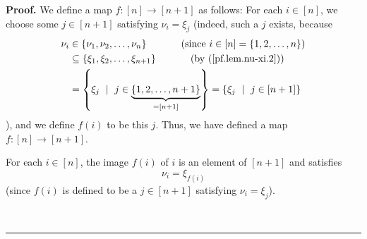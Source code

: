 \documentclass
[numbers=enddot,12pt,final,onecolumn,notitlepage,english]{scrartcl}%
\theoremstyle{definition}
\newenvironment{proof}[1][Proof]{\noindent\textbf{#1.} }{\ \rule{0.5em}{0.5em}}
\newenvironment{verlong}{}{}
\begin{document}
\begin{verlong}
\begin{proof}
We define a map $f:\left[  n\right]  \rightarrow\left[  n+1\right]  $ as
follows: For each $i\in\left[  n\right]  $, we choose some $j\in\left[
n+1\right]  $ satisfying $\nu_{i}=\xi_{j}$ (indeed, such a $j$ exists,
because
\begin{align*}
\nu_{i}  &  \in\left\{  \nu_{1},\nu_{2},\ldots,\nu_{n}\right\}
\ \ \ \ \ \ \ \ \ \ \left(  \text{since }i\in\left[  n\right]  =\left\{
1,2,\ldots,n\right\}  \right) \\
&  \subseteq\left\{  \xi_{1},\xi_{2},\ldots,\xi_{n+1}\right\}
\ \ \ \ \ \ \ \ \ \ \left(  \text{by (\ref{pf.lem.nu-xi.2})}\right) \\
&  =\left\{  \xi_{j}\ \mid\ j\in\underbrace{\left\{  1,2,\ldots,n+1\right\}
}_{=\left[  n+1\right]  }\right\}  =\left\{  \xi_{j}\ \mid\ j\in\left[
n+1\right]  \right\}
\end{align*}
), and we define $f\left(  i\right)  $ to be this $j$. Thus, we have defined a
map $f:\left[  n\right]  \rightarrow\left[  n+1\right]  $.

For each $i\in\left[  n\right]  $, the image $f\left(  i\right)  $ of $i$ is
an element of $\left[  n+1\right]  $ and satisfies%
\begin{equation}
\nu_{i}=\xi_{f\left(  i\right)  } \label{pf.lem.nu-xi.def-f.2}%
\end{equation}
(since $f\left(  i\right)  $ is defined to be a $j\in\left[  n+1\right]  $
satisfying $\nu_{i}=\xi_{j}$).


\end{proof}
\end{verlong}
\end{document}
